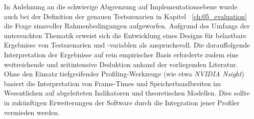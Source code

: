 In Anlehnung an die schwierige Abgrenzung auf Implementationsebene wurde auch bei der Definition der genauen
Testszenarien in Kapitel ~\ref{ch:05_evaluation} die Frage sinnvoller Rahmenbedingungen aufgeworfen.
Aufgrund des Umfangs der untersuchten Thematik erweist sich die Entwicklung eines Designs für belastbare Ergebnisse von
Testszenarien und -variablen als anspruchsvoll.
Die darauffolgende Interpretation der Ergebnisse auf rein empirischer Basis erforderte zudem eine weitreichende und
zeitintensive Deduktion anhand der vorliegenden Literatur.
Ohne den Einsatz tiefgreifender Profiling-Werkzeuge (wie etwa \textit{NVIDIA Nsight}) basiert die Interpretation von
Frame-Times und Speicherbandbreiten im Wesentlichen auf abgeleiteten Indikatoren und theoretischen Modellen.
Dies sollte in zukünftigen Erweiterungen der Software durch die Integration jener Profiler vermieden werden.
